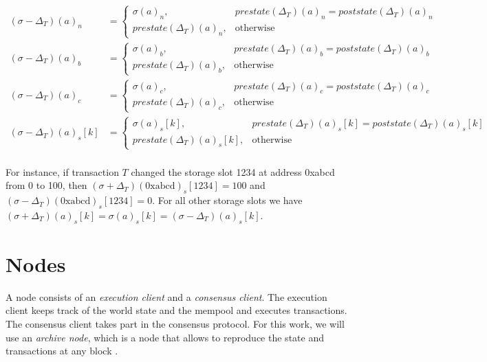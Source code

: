 \documentclass[draft,final]{vutinfth} %
\begin{document}
\begin{align*}
    (\sigma - \Delta_T)(a)_n    & =
    \begin{cases}
        \sigma(a)_n,             & prestate(\Delta_T)(a)_n = poststate(\Delta_T)(a)_n \\
        prestate(\Delta_T)(a)_n, & \text{otherwise}
    \end{cases}          \\
    (\sigma - \Delta_T)(a)_b    & =
    \begin{cases}
        \sigma(a)_b,             & prestate(\Delta_T)(a)_b = poststate(\Delta_T)(a)_b \\
        prestate(\Delta_T)(a)_b, & \text{otherwise}
    \end{cases}          \\
    (\sigma - \Delta_T)(a)_c    & =
    \begin{cases}
        \sigma(a)_c,             & prestate(\Delta_T)(a)_c = poststate(\Delta_T)(a)_c \\
        prestate(\Delta_T)(a)_c, & \text{otherwise}
    \end{cases}          \\
    (\sigma - \Delta_T)(a)_s[k] & =
    \begin{cases}
        \sigma(a)_s[k],             & prestate(\Delta_T)(a)_s[k] = poststate(\Delta_T)(a)_s[k] \\
        prestate(\Delta_T)(a)_s[k], & \text{otherwise}
    \end{cases} \\
\end{align*}

For instance, if transaction $T$ changed the storage slot 1234 at address 0xabcd from 0 to 100, then $(\sigma + \Delta_T)(\text{0xabcd})_s[1234] = 100$ and $(\sigma - \Delta_T)(\text{0xabcd})_s[1234] = 0$. For all other storage slots we have $(\sigma + \Delta_T)(a)_s[k] = \sigma(a)_s[k] = (\sigma - \Delta_T)(a)_s[k]$.

\section{Nodes}

A node consists of an \emph{execution client} and a \emph{consensus client}. The execution client keeps track of the world state and the mempool and executes transactions. The consensus client takes part in the consensus protocol. For this work, we will use an \emph{archive node}, which is a node that allows to reproduce the state and transactions at any block \cite{noauthor_nodes_2024}.
\end{document}
